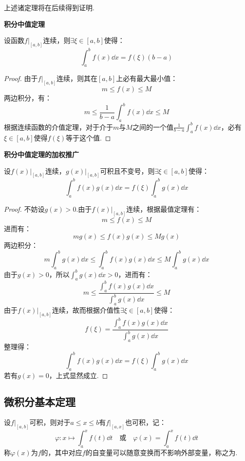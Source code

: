 上述诸定理将在后续得到证明.

\begin{theorem}
    \textbf{积分中值定理}

    设函数$\left.f\right|_{[a,b]}$连续，则$\exists \xi \in [a,b]$使得：
    \[\int_{a}^{b}f(x)\dd{x} = f(\xi)(b-a)\]
\end{theorem}

\begin{proof}
    由于$\left.f\right|_{[a,b]}$连续，则其在$[a,b]$上必有最大最小值：
    \[m \leqslant f(x) \leqslant M\]
    两边积分，有：
    \[m \leqslant \frac{1}{b-a}\int_{a}^{b}f(x)\dd{x} \leqslant M\]
    根据连续函数的介值定理，对于介于$m$与$M$之间的一个值$\displaystyle\frac{1}{b-a}\int_{a}^{b}f(x)\dd{x}$，必有$\xi \in [a,b]$使得$f(\xi)$等于这个值.
\end{proof}

\begin{theorem}
    \textbf{积分中值定理的加权推广}

    设$\left.f(x)\right|_{[a,b]}$连续，$\left.g(x)\right|_{[a,b]}$可积且不变号，则$\exists \xi\in[a,b]$使得：
    \[\int_{a}^{b}f(x)g(x)\dd{x} = f(\xi)\int_{a}^{b}g(x)\dd{x}\]
\end{theorem}

\begin{proof}
    不妨设$g(x)>0$.由于$\left.f(x)\right|_{[a,b]}$连续，根据最值定理有：
    \[m \leqslant f(x) \leqslant M\]
    进而有：
    \[mg(x) \leqslant f(x)g(x) \leqslant Mg(x)\]
    两边积分：
    \[m \int_{a}^{b}g(x)\dd{x} \leqslant \int_{a}^{b}f(x)g(x)\dd{x} \leqslant M \int_{a}^{b}g(x)\dd{x}\]
    由于$g(x)>0$，所以$\displaystyle\int_{a}^{b}g(x)\dd{x} > 0$，进而有：
    \[m \leqslant \frac{\int_{a}^{b}f(x)g(x)\dd{x}}{\int_{a}^{b}g(x)\dd{x}} \leqslant M\]
    由于$\left.f(x)\right|_{[a,b]}$连续，故而根据介值性$\exists \xi \in [a,b]$使得：
    \[f(\xi) = \frac{\int_{a}^{b}f(x)g(x)\dd{x}}{\int_{a}^{b}g(x)\dd{x}}\]
    整理得：
    \[\int_{a}^{b}f(x)g(x)\dd{x} = f(\xi)\int_{a}^{b}g(x)\dd{x}\]
    若有$g(x)=0$，上式显然成立.
\end{proof}


\subsection{微积分基本定理}
\begin{definition}
    设$\left.f\right|_{[a,b]}$可积，则对于$a\leqslant x \leqslant b$有$\left.f\right|_{[a,x]}$也可积，记：
    \[\varphi: x \mapsto \int_{a}^{x}f(t)\dd{t} \quad\text{或}\quad \varphi(x) = \int_{a}^{x}f(t)\dd{t}\]
    称$\varphi(x)$为$f$的，其中对应$f$的自变量可以随意变换而不影响外部变量，称之为.
\end{definition}

